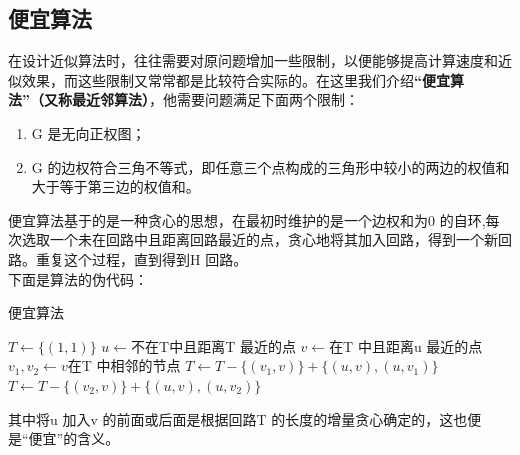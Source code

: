 \documentclass[11pt,a4paper,openany]{book}
\begin{document}
\subsection{便宜算法}
\indent 在设计近似算法时，往往需要对原问题增加一些限制，以便能够提高计算速度和近似效果，而这些限制又常常都是比较符合实际的。在这里我们介绍\textbf{“便宜算法”（又称最近邻算法）}，他需要问题满足下面两个限制：\\
\begin{enumerate}
  \item G 是无向正权图；
  \item G 的边权符合三角不等式，即任意三个点构成的三角形中较小的两边的权值和大于等于第三边的权值和。
\end{enumerate}
\indent 便宜算法基于的是一种贪心的思想，在最初时维护的是一个边权和为0 的自环,每次选取一个未在回路中且距离回路最近的点，贪心地将其加入回路，得到一个新回路。重复这个过程，直到得到H 回路。\\
下面是算法的伪代码：\\
\begin{algorithm}
\renewcommand{\algorithmicrequire}{\textbf{Input:}}
\renewcommand\algorithmicensure {\textbf{Output:}}
    \caption{便宜算法}
    \begin{algorithmic}[1]
      \label{alg:pysf}  %
      \STATE $T\leftarrow\{(1,1)\}$
          \STATE $u\leftarrow$不在T中且距离T 最近的点
          \STATE $v\leftarrow$在T 中且距离u 最近的点
          \STATE $v_1, v_2 \leftarrow v$在T 中相邻的节点
             \STATE $ T\leftarrow T −\{(v_1,v)\} + \{(u,v),(u,v_1)\}$
          \ELSE{}
              \STATE  $ T\leftarrow T −\{(v_2,v)\} + \{(u,v),(u,v_2)\}$
          \ENDIF
      \ENDWHILE

    \end{algorithmic}
\end{algorithm}
\indent 其中将u 加入v 的前面或后面是根据回路T 的长度的增量贪心确定的，这也便是“便宜”的含义。
\end{document}
